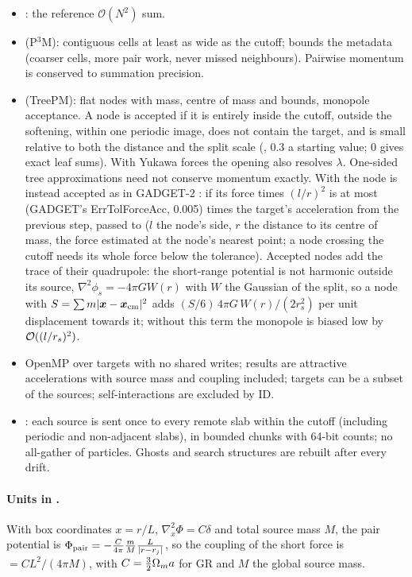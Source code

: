 \begin{itemize}
\item {}: the reference $\mathcal O(N^2)$ sum.
\item {} (P$^3$M): contiguous cells at least as wide as the cutoff;  bounds the metadata
      (coarser cells, more pair work, never missed neighbours). Pairwise momentum is conserved to summation precision.
\item {} (TreePM): flat nodes with mass, centre of mass and bounds, monopole acceptance. A node is accepted if
      it is entirely inside the cutoff, outside the softening, within one periodic image, does not contain the target,
      and is small relative to both the distance and the split scale (, $0.3$ a
      starting value; $0$ gives exact leaf sums). With Yukawa forces the opening also resolves $\lambda$. One-sided
      tree approximations need not conserve momentum exactly.
      With  the node is instead accepted as in GADGET-2
      \cite{Springel2005}: if its force times $(l/r)^2$ is at most  (GADGET's ErrTolForceAcc,
      0.005) times the target's acceleration from the previous step, passed to 
      ($l$ the node's side, $r$ the distance to its centre of mass, the force estimated at the node's nearest point; a
      node crossing the cutoff needs its whole force below the tolerance). Accepted nodes add the trace of their
      quadrupole: the short-range potential is not harmonic outside its source, $\nabla^2\phi_s=-4\pi GW(r)$ with $W$
      the Gaussian of the split, so a node with $S=\sum m|\vec x-\vec x_{\rm cm}|^2$ adds
      $(S/6)\,4\pi G\,W(r)/(2r_s^2)$ per unit displacement towards it; without this term the monopole is biased low
      by $\order{(l/r_s)^2}$.
\item OpenMP over targets with no shared writes; results are attractive accelerations with source mass and coupling
      included; targets can be a subset of the sources; self-interactions are excluded by ID.
\item {}: each source is sent once to every remote slab within the cutoff (including periodic
      and non-adjacent slabs), in bounded chunks with 64-bit counts; no all-gather of particles. Ghosts and search
      structures are rebuilt after every drift.
\end{itemize}

\paragraph*{Units in \fml{}.} With box coordinates $x=r/L$, $\nabla_x^2\Phi=C\delta$ and total source mass $M$, the pair
potential is $\Phi_{\rm pair}=-\frac{C}{4\pi}\frac mM\frac{L}{|r-r_j|}$, so the coupling of the short force is
 $=CL^2/(4\pi M)$, with $C=\frac32\Om_ma$ for GR and $M$ the
global source mass.

